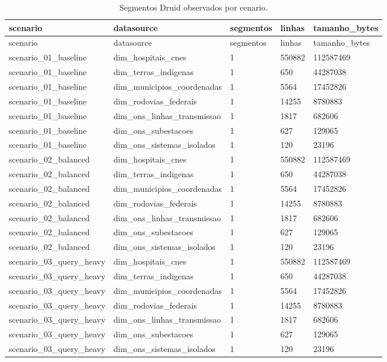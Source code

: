 \begin{landscape}
{
\scriptsize
\setlength{\tabcolsep}{4pt}
\renewcommand{\arraystretch}{1.15}
\begin{longtable}{lllll}
\caption{Segmentos Druid observados por cenario.}\\
\toprule
scenario & datasource & segmentos & linhas & tamanho\_bytes \\
\midrule
\endfirsthead
\toprule
scenario & datasource & segmentos & linhas & tamanho\_bytes \\
\midrule
\endhead
scenario\_01\_baseline & dim\_hospitais\_cnes & 1 & 550882 & 112587469 \\
scenario\_01\_baseline & dim\_terras\_indigenas & 1 & 650 & 44287038 \\
scenario\_01\_baseline & dim\_municipios\_coordenadas & 1 & 5564 & 17452826 \\
scenario\_01\_baseline & dim\_rodovias\_federais & 1 & 14255 & 8780883 \\
scenario\_01\_baseline & dim\_ons\_linhas\_transmissao & 1 & 1817 & 682606 \\
scenario\_01\_baseline & dim\_ons\_subestacoes & 1 & 627 & 129065 \\
scenario\_01\_baseline & dim\_ons\_sistemas\_isolados & 1 & 120 & 23196 \\
scenario\_02\_balanced & dim\_hospitais\_cnes & 1 & 550882 & 112587469 \\
scenario\_02\_balanced & dim\_terras\_indigenas & 1 & 650 & 44287038 \\
scenario\_02\_balanced & dim\_municipios\_coordenadas & 1 & 5564 & 17452826 \\
scenario\_02\_balanced & dim\_rodovias\_federais & 1 & 14255 & 8780883 \\
scenario\_02\_balanced & dim\_ons\_linhas\_transmissao & 1 & 1817 & 682606 \\
scenario\_02\_balanced & dim\_ons\_subestacoes & 1 & 627 & 129065 \\
scenario\_02\_balanced & dim\_ons\_sistemas\_isolados & 1 & 120 & 23196 \\
scenario\_03\_query\_heavy & dim\_hospitais\_cnes & 1 & 550882 & 112587469 \\
scenario\_03\_query\_heavy & dim\_terras\_indigenas & 1 & 650 & 44287038 \\
scenario\_03\_query\_heavy & dim\_municipios\_coordenadas & 1 & 5564 & 17452826 \\
scenario\_03\_query\_heavy & dim\_rodovias\_federais & 1 & 14255 & 8780883 \\
scenario\_03\_query\_heavy & dim\_ons\_linhas\_transmissao & 1 & 1817 & 682606 \\
scenario\_03\_query\_heavy & dim\_ons\_subestacoes & 1 & 627 & 129065 \\
scenario\_03\_query\_heavy & dim\_ons\_sistemas\_isolados & 1 & 120 & 23196 \\
\bottomrule
\end{longtable}
}
\end{landscape}
